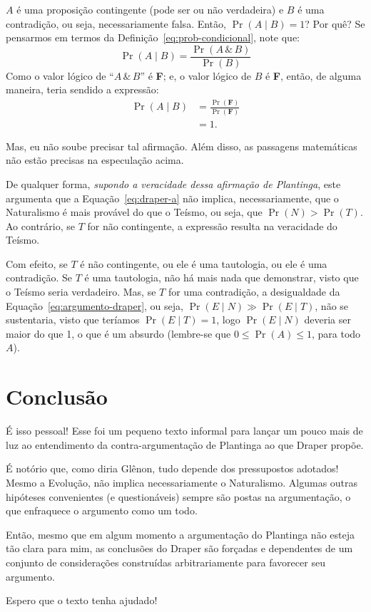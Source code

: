 \documentclass[12pt]{article}
\theoremstyle{definition}
\newcommand{\F}{\textbf{F}}
\begin{document}
		$A$ é uma proposição contingente (pode ser ou não verdadeira) e $B$ é uma
		contradição, ou seja, necessariamente falsa.
		Então, $ \Pr{(A \mid B)} = 1 $?
		Por quê?
		Se pensarmos em termos da Definição~\ref{eq:prob-condicional}, note que:
		\[
		 \Pr{(A \mid B)} = \frac{\Pr{(A \,\&\, B)}}{\Pr{(B)}}
		\]
		Como o valor lógico de ``$A\,\&\, B$'' é \F; e, o valor lógico de $B$ é \F,
		então, de alguma maneira, teria sendido a expressão:
		\begin{align*}
		 \Pr{(A \mid B)} &= \frac{\Pr{(\F)}}{\Pr{(\F)}}\\
			&= 1.
		\end{align*}
		
		Mas, eu não soube precisar tal afirmação.
		Além disso, as passagens matemáticas não estão precisas na especulação acima.
		
		De qualquer forma, \textit{supondo a veracidade dessa afirmação de Plantinga},
		este argumenta que a Equação~\ref{eq:draper-a} não implica, necessariamente,
		que o Naturalismo é mais provável do que o Teísmo, ou seja, que 
		$\Pr{(N)} > \Pr{(T)}$.
		Ao contrário, se $T$ for não contingente, a expressão resulta na veracidade
		do Teísmo.
		
		Com efeito, se $T$ é não contingente, ou ele é uma tautologia, ou ele é uma
		contradição. 
		Se $T$ é uma tautologia, não há mais nada que demonstrar, visto que o Teísmo
		seria verdadeiro.
		Mas, se $T$ for uma contradição, a desigualdade da 
		Equação~\ref{eq:argumento-draper},	ou seja, 
		$ \Pr{(E \mid N)} \gg \Pr{(E \mid T)} $, não se sustentaria, visto que 
		teríamos $\Pr{(E\mid T)} = 1$, logo $\Pr{(E \mid N )}$ deveria ser maior do
		que 1, o que é um absurdo (lembre-se que $0\leq\Pr{(A)}\leq 1$, para todo 
		$A$).
		
\section{Conclusão}
É isso pessoal!
Esse foi um pequeno texto informal para lançar um pouco mais de luz ao 
entendimento da contra-argumentação de Plantinga ao que Draper propõe.

É notório que, como diria Glênon, tudo depende dos pressupostos adotados!
Mesmo a Evolução, não implica necessariamente o Naturalismo.
Algumas outras hipóteses convenientes (e questionáveis) sempre são postas na
argumentação, o que enfraquece o argumento como um todo.

Então, mesmo que em algum momento a argumentação do Plantinga não esteja tão
clara para mim, as conclusões do Draper são forçadas e dependentes de um 
conjunto de considerações construídas arbitrariamente para favorecer seu 
argumento.

Espero que o texto tenha ajudado! 
\end{document}
